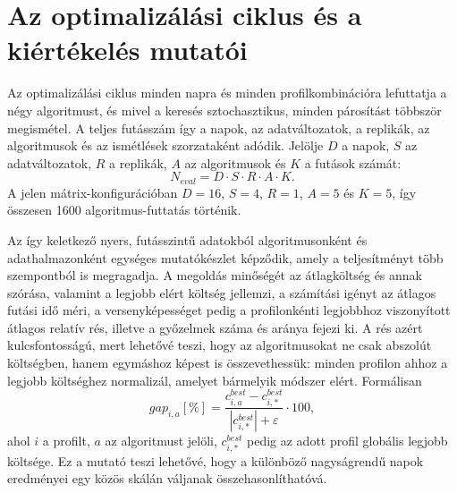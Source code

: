 \section{Az optimalizálási ciklus és a kiértékelés mutatói}
Az optimalizálási ciklus minden napra és minden profilkombinációra lefuttatja a négy algoritmust, és mivel a keresés sztochasztikus, minden párosítást többször megismétel. A teljes futásszám így a napok, az adatváltozatok, a replikák, az algoritmusok és az ismétlések szorzataként adódik. Jelölje $D$ a napok, $S$ az adatváltozatok, $R$ a replikák, $A$ az algoritmusok és $K$ a futások számát:
\begin{equation}
N_{eval} = D \cdot S \cdot R \cdot A \cdot K .
\end{equation}
A jelen mátrix-konfigurációban $D=16$, $S=4$, $R=1$, $A=5$ és $K=5$, így összesen 1600 algoritmus-futtatás történik.

Az így keletkező nyers, futásszintű adatokból algoritmusonként és adathalmazonként egységes mutatókészlet képződik, amely a teljesítményt több szempontból is megragadja. A megoldás minőségét az átlagköltség és annak szórása, valamint a legjobb elért költség jellemzi, a számítási igényt az átlagos futási idő méri, a versenyképességet pedig a profilonkénti legjobbhoz viszonyított átlagos relatív rés, illetve a győzelmek száma és aránya fejezi ki. A rés azért kulcsfontosságú, mert lehetővé teszi, hogy az algoritmusokat ne csak abszolút költségben, hanem egymáshoz képest is összevethessük: minden profilon ahhoz a legjobb költséghez normalizál, amelyet bármelyik módszer elért. Formálisan
\begin{equation}
gap_{i,a}[\%] = \frac{c^{best}_{i,a} - c^{best}_{i,*}}{|c^{best}_{i,*}|+\varepsilon} \cdot 100,
\end{equation}
ahol $i$ a profilt, $a$ az algoritmust jelöli, $c^{best}_{i,*}$ pedig az adott profil globális legjobb költsége. Ez a mutató teszi lehetővé, hogy a különböző nagyságrendű napok eredményei egy közös skálán váljanak összehasonlíthatóvá.
